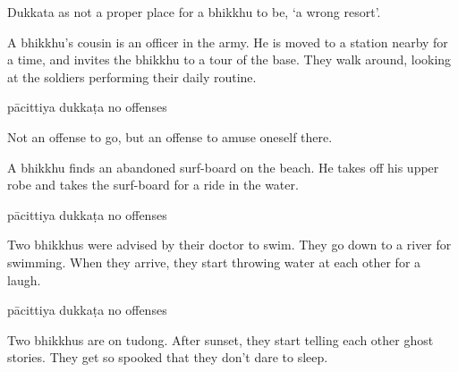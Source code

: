 \begin{exam}{\autoExamName}
\begin{problem*}
\begin{parts}
      \begin{solution}
        Dukkata as not a proper place for a bhikkhu to be, `a wrong resort'.
      \end{solution}

      \bigskip

      \item A bhikkhu's cousin is an officer in the army. He is moved to a
      station nearby for a time, and invites the bhikkhu to a tour of the base.
      They walk around, looking at the soldiers performing their daily routine.

      \bigskip

      \begin{answers}{3}
        \bChoices
         pācittiya\eAns
         dukkaṭa\eAns
         no offenses\eAns
        \eChoices
      \end{answers}

      \begin{solution}
        Not an offense to go, but an offense to amuse oneself there.
      \end{solution}

      \bigskip

      \item A bhikkhu finds an abandoned surf-board on the beach. He takes off his upper
      robe and takes the surf-board for a ride in the water.

      \bigskip

      \begin{answers}{3}
        \bChoices
         pācittiya\eAns
         dukkaṭa\eAns
         no offenses\eAns
        \eChoices
      \end{answers}

      \bigskip

      \item Two bhikkhus were advised by their doctor to swim. They go down to a
      river for swimming. When they arrive, they start throwing water at each
      other for a laugh.

      \bigskip

      \begin{answers}{3}
        \bChoices
         pācittiya\eAns
         dukkaṭa\eAns
         no offenses\eAns
        \eChoices
      \end{answers}

      \bigskip

      \item Two bhikkhus are on tudong. After sunset, they start telling each
      other ghost stories. They get so spooked that they don't dare to sleep.


\end{parts}
\end{problem*}
\end{exam}
